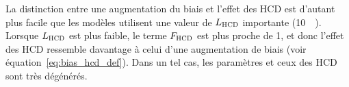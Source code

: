   La distinction entre une augmentation du biais et l'effet des HCD est d'autant plus facile que les modèles utilisent une valeur de $L_{\textsc{HCD}}$ importante (\SI{10}{\perh\Mpc}). Lorsque $L_{\textsc{HCD}}$ est plus faible, le terme $F_{\textsc{HCD}}$ est plus proche de 1, et donc l'effet des HCD ressemble davantage à celui d'une augmentation de biais (voir équation~\ref{eq:bias_hcd_def}). Dans un tel cas, les paramètres \lya{} et ceux des HCD sont très dégénérés.

